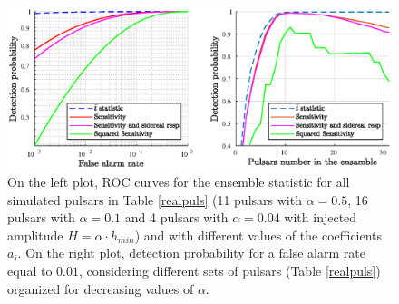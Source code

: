\documentclass[11pt,a4paper,final]{iopart}
\begin{document}
\begin{figure}%
        \includegraphics[clip,trim=45 0 0 10,scale=0.9]{2in1ultimo2.eps}
    \caption{On the left plot, ROC curves for the ensemble statistic for all simulated pulsars in Table \ref{realpuls} (11 pulsars with $\alpha=0.5$, 16 pulsars with $\alpha=0.1$ and 4 pulsars with $\alpha=0.04$ with injected amplitude $H=\alpha\cdot h_{min}$) and with different values of the coefficients $a_i$. On the right plot, detection probability for a false alarm rate equal to $0.01$, considering different sets of pulsars (Table \ref{realpuls}) organized for decreasing values of $\alpha$. } 
    \label{choicet}
     \vspace{-10pt}
\end{figure}
\end{document}

